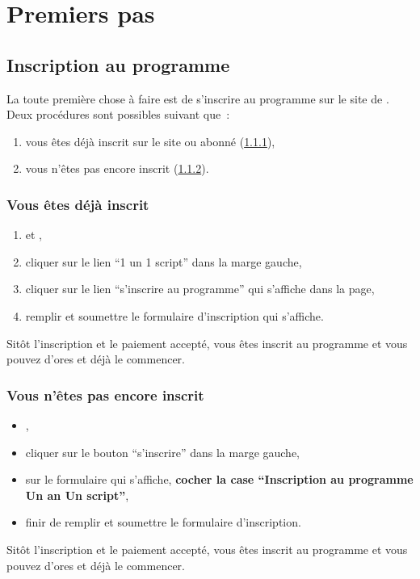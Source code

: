 \chapter{Premiers pas}\label{premiersPas}

\section{Inscription au programme}\label{inscriptionProgramme}

La toute première chose à faire est de s'inscrire au programme \unan{} sur le site de \boa{}. Deux procédures sont possibles suivant que~:

\begin{enumerate}
  \item vous êtes déjà inscrit sur le site ou abonné (\ref{inscriptionAuteurDejaInscrit}),
  \item vous n'êtes pas encore inscrit (\ref{inscriptionAuteurNonInscrit}).
\end{enumerate}

\subsection{Vous êtes déjà inscrit}\label{inscriptionAuteurDejaInscrit}

\begin{enumerate}
  \item \rejoindreLeSite et \vousIdentifier,
  \item cliquer sur le lien \enquote{1 un 1 script} dans la marge gauche,
  \item cliquer sur le lien \enquote{s'inscrire au programme} qui s'affiche dans la page,
  \item remplir et soumettre le formulaire d'inscription qui s'affiche.
\end{enumerate}

Sitôt l'inscription et le paiement accepté, vous êtes inscrit au programme et vous pouvez d'ores et déjà le commencer.

\subsection{Vous n'êtes pas encore inscrit}\label{inscriptionAuteurNonInscrit}

\begin{itemize}
  \item \rejoindreLeSite,
  \item cliquer sur le bouton \enquote{s'inscrire} dans la marge gauche,
  \item sur le formulaire qui s'affiche, \textbf{cocher la case \enquote{Inscription au programme Un an Un script}},
  \item finir de remplir et soumettre le formulaire d'inscription.
\end{itemize}

Sitôt l'inscription et le paiement accepté, vous êtes inscrit au programme et vous pouvez d'ores et déjà le commencer.
